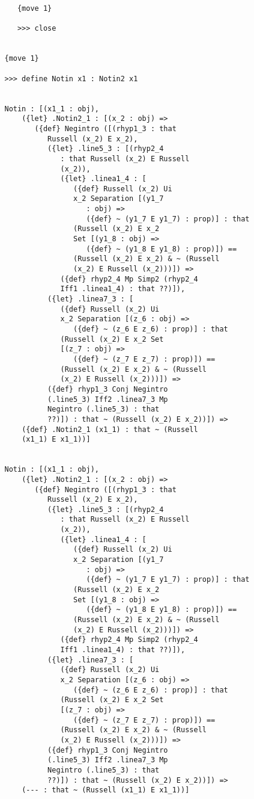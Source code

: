 \documentclass[12pt]{article}
\begin{document}
\begin{verbatim}
      {move 1}

      >>> close


   {move 1}

   >>> define Notin x1 : Notin2 x1


   Notin : [(x1_1 : obj), 
       ({let} .Notin2_1 : [(x_2 : obj) => 
          ({def} Negintro ([(rhyp1_3 : that 
             Russell (x_2) E x_2), 
             ({let} .line5_3 : [(rhyp2_4 
                : that Russell (x_2) E Russell 
                (x_2)), 
                ({let} .linea1_4 : [
                   ({def} Russell (x_2) Ui 
                   x_2 Separation [(y1_7 
                      : obj) => 
                      ({def} ~ (y1_7 E y1_7) : prop)] : that 
                   (Russell (x_2) E x_2 
                   Set [(y1_8 : obj) => 
                      ({def} ~ (y1_8 E y1_8) : prop)]) == 
                   (Russell (x_2) E x_2) & ~ (Russell 
                   (x_2) E Russell (x_2)))]) => 
                ({def} rhyp2_4 Mp Simp2 (rhyp2_4 
                Iff1 .linea1_4) : that ??)]), 
             ({let} .linea7_3 : [
                ({def} Russell (x_2) Ui 
                x_2 Separation [(z_6 : obj) => 
                   ({def} ~ (z_6 E z_6) : prop)] : that 
                (Russell (x_2) E x_2 Set 
                [(z_7 : obj) => 
                   ({def} ~ (z_7 E z_7) : prop)]) == 
                (Russell (x_2) E x_2) & ~ (Russell 
                (x_2) E Russell (x_2)))]) => 
             ({def} rhyp1_3 Conj Negintro 
             (.line5_3) Iff2 .linea7_3 Mp 
             Negintro (.line5_3) : that 
             ??)]) : that ~ (Russell (x_2) E x_2))]) => 
       ({def} .Notin2_1 (x1_1) : that ~ (Russell 
       (x1_1) E x1_1))]


   Notin : [(x1_1 : obj), 
       ({let} .Notin2_1 : [(x_2 : obj) => 
          ({def} Negintro ([(rhyp1_3 : that 
             Russell (x_2) E x_2), 
             ({let} .line5_3 : [(rhyp2_4 
                : that Russell (x_2) E Russell 
                (x_2)), 
                ({let} .linea1_4 : [
                   ({def} Russell (x_2) Ui 
                   x_2 Separation [(y1_7 
                      : obj) => 
                      ({def} ~ (y1_7 E y1_7) : prop)] : that 
                   (Russell (x_2) E x_2 
                   Set [(y1_8 : obj) => 
                      ({def} ~ (y1_8 E y1_8) : prop)]) == 
                   (Russell (x_2) E x_2) & ~ (Russell 
                   (x_2) E Russell (x_2)))]) => 
                ({def} rhyp2_4 Mp Simp2 (rhyp2_4 
                Iff1 .linea1_4) : that ??)]), 
             ({let} .linea7_3 : [
                ({def} Russell (x_2) Ui 
                x_2 Separation [(z_6 : obj) => 
                   ({def} ~ (z_6 E z_6) : prop)] : that 
                (Russell (x_2) E x_2 Set 
                [(z_7 : obj) => 
                   ({def} ~ (z_7 E z_7) : prop)]) == 
                (Russell (x_2) E x_2) & ~ (Russell 
                (x_2) E Russell (x_2)))]) => 
             ({def} rhyp1_3 Conj Negintro 
             (.line5_3) Iff2 .linea7_3 Mp 
             Negintro (.line5_3) : that 
             ??)]) : that ~ (Russell (x_2) E x_2))]) => 
       (--- : that ~ (Russell (x1_1) E x1_1))]



\end{verbatim}
\end{document}
